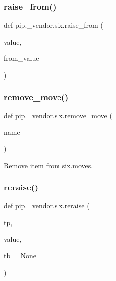\subsubsection{\texorpdfstring{raise\+\_\+from()}{raise\_from()}}
{\footnotesize\ttfamily def pip.\+\_\+vendor.\+six.\+raise\+\_\+from (\begin{DoxyParamCaption}\item[{}]{value,  }\item[{}]{from\+\_\+value }\end{DoxyParamCaption})}

\mbox{\label{namespacepip_1_1__vendor_1_1six_a9a39a7fc7fa0233c25e2fc090f865b5b}} 
\subsubsection{\texorpdfstring{remove\+\_\+move()}{remove\_move()}}
{\footnotesize\ttfamily def pip.\+\_\+vendor.\+six.\+remove\+\_\+move (\begin{DoxyParamCaption}\item[{}]{name }\end{DoxyParamCaption})}

\begin{DoxyVerb}Remove item from six.moves.\end{DoxyVerb}
 \mbox{\label{namespacepip_1_1__vendor_1_1six_af6a8c78d8b7789637b979d7a92a40946}} 
\subsubsection{\texorpdfstring{reraise()}{reraise()}}
{\footnotesize\ttfamily def pip.\+\_\+vendor.\+six.\+reraise (\begin{DoxyParamCaption}\item[{}]{tp,  }\item[{}]{value,  }\item[{}]{tb = {\ttfamily None} }\end{DoxyParamCaption})}

\mbox{\label{namespacepip_1_1__vendor_1_1six_a9df889144ce243c30726ac415b37c8eb}} 
